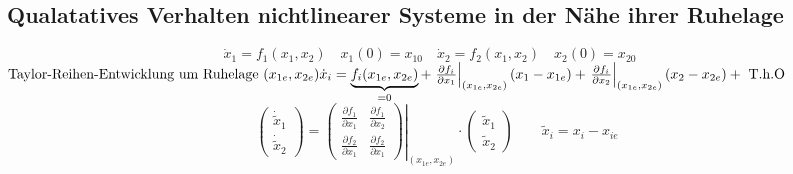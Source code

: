 \documentclass[11pt,a4paper]{article}
\begin{document}
\subsection{Qualatatives Verhalten nichtlinearer Systeme in der Nähe ihrer Ruhelage}
\begin{equation}
\dot x_1 = f_1(x_1,x_2)\quad x_1(0) = x_{10} \quad \dot x_2 = f_2(x_1,x_2)\quad x_2(0)=x_{20} \quad
\tag{2.6}
\label{eq:2.6}
\end{equation}
$\text{Taylor-Reihen-Entwicklung um Ruhelage }(x_{1e}, x_{2e})\\
\dot x_i = \underbrace{f_i (x_{1e}, x_{2e}) }_{=0}+ \left. \frac{\partial f_i}{\partial x_1}\right|_{(x_{1e}, x_{2e})}(x_1 - x_{1e}) + \left. \frac{\partial f_i}{\partial x_2}\right|_{(x_{1e}, x_{2e})}(x_2 - x_{2e}) + \text{ T.h.O}\\
$
\begin{equation}
\begin{pmatrix}
\dot{\tilde{x}}_1\\
\dot{\tilde{x}}_2
\end{pmatrix}=\left.
\begin{pmatrix}
\frac{\partial f_1}{\partial x_1}& \frac{\partial f_1}{\partial x_2} \\
\frac{\partial f_2}{\partial x_1}& \frac{\partial f_2}{\partial x_1}
\end{pmatrix}\right|_{(x_{1e}, x_{2e})} \cdot
\begin{pmatrix}
\tilde{x}_1\\
\tilde{x}_2
\end{pmatrix} \qquad \tilde x_i = x_i - x_{ie}
\tag{2.7}
\end{equation}
\end{document}
